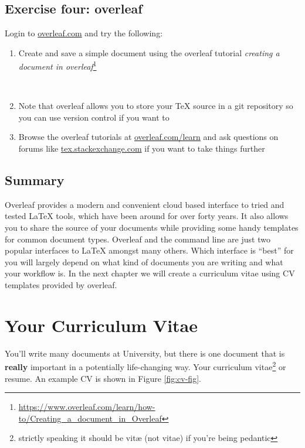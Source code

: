 \documentclass[
]{book}
\providecommand{\tightlist}{%
  \setlength{\itemsep}{0pt}\setlength{\parskip}{0pt}}
\begin{document}
\section{Exercise four: overleaf}\label{ex4}

Login to \href{https://www.overleaf.com/}{overleaf.com} and try the following:

\begin{enumerate}
\def\labelenumi{\arabic{enumi}.}
\tightlist
\item
  Create and save a simple document using the overleaf tutorial \emph{creating a document in overleaf}\footnote{\url{https://www.overleaf.com/learn/how-to/Creating_a_document_in_Overleaf}}\strut \\
\item
  Note that overleaf allows you to store your TeX source in a git repository so you can use version control if you want to
\item
  Browse the overleaf tutorials at \href{https://www.overleaf.com/learn}{overleaf.com/learn} and ask questions on forums like \href{https://tex.stackexchange.com/}{tex.stackexchange.com} if you want to take things further
\end{enumerate}

\section{Summary}\label{overleafconc}

Overleaf provides a modern and convenient cloud based interface to tried and tested LaTeX tools, which have been around for over forty years. \citep{knuth} It also allows you to share the source of your documents while providing some handy templates for common document types. Overleaf and the command line are just two popular interfaces to LaTeX amongst many others. \citep{latexproject} Which interface is ``best'' for you will largely depend on what kind of documents you are writing and what your workflow is. In the next chapter we will create a curriculum vitae using CV templates provided by overleaf.

\chapter{Your Curriculum Vitae}\label{cv}

You'll write many documents at University, but there is one document that is \textbf{really} important in a potentially life-changing way. Your curriculum vitae\footnote{strictly speaking it should be vitæ (not vitae) if you're being pedantic} or resume. An example CV is shown in Figure \ref{fig:cv-fig}.
\end{document}
